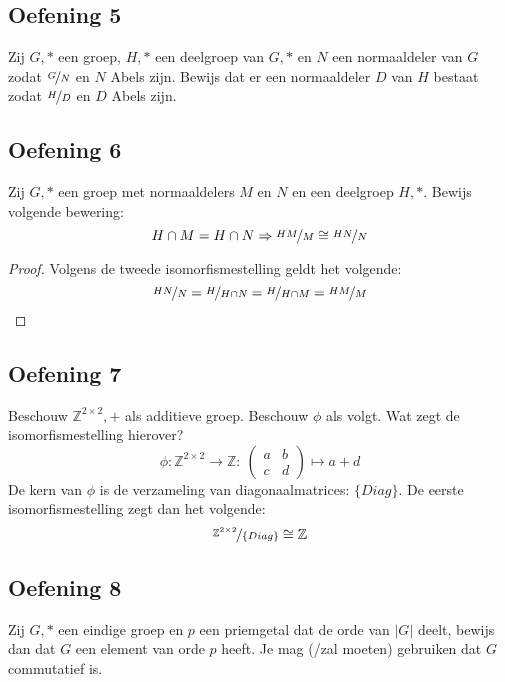 \documentclass[main.tex]{subfiles}
\begin{document}
\subsection*{Oefening 5}
\label{sec:oz5-oef5} 
Zij $G,*$ een groep, $H,*$ een deelgroep van $G,*$ en $N$ een normaaldeler van $G$ zodat $\nicefrac{G}{N}$ en $N$ Abels zijn.
Bewijs dat er een normaaldeler $D$ van $H$ bestaat zodat $\nicefrac{H}{D}$ en $D$ Abels zijn.

\subsection*{Oefening 6}
\label{sec:oz5-oef6}
Zij $G,*$ een groep met normaaldelers $M$ en $N$ en een deelgroep $H,*$. 
Bewijs volgende bewering:
\[ H \cap M = H \cap N \Rightarrow \nicefrac{HM}{M} \cong \nicefrac{HN}{N} \]
\begin{proof}
  Volgens de tweede isomorfismestelling geldt het volgende:
  \[ \nicefrac{HN}{N} = \nicefrac{H}{H\cap N} = \nicefrac{H}{H\cap M} = \nicefrac{HM}{M} \]
\end{proof}

\subsection*{Oefening 7}
\label{sec:oz5-oef7}
Beschouw $\mathbb{Z}^{2\times 2},+$ als additieve groep.
Beschouw $\phi$ als volgt. Wat zegt de isomorfismestelling hierover?
\[
\phi: \mathbb{Z}^{2\times 2} \rightarrow \mathbb{Z}:\
\begin{pmatrix}
  a & b\\
  c & d
\end{pmatrix}
\mapsto a + d
\]
De kern van $\phi$ is de verzameling van diagonaalmatrices: $\{Diag\}$.
De eerste isomorfismestelling zegt dan het volgende:
\[ \nicefrac{\mathbb{Z}^{2\times 2}}{\{Diag\}} \cong \mathbb{Z} \]
\begin{figure}[H]
  \centering
\end{figure}

\subsection*{Oefening 8}
Zij $G,*$ een eindige groep en $p$ een priemgetal dat de orde van $|G|$ deelt, bewijs dan dat $G$ een element van orde $p$ heeft. Je mag (/zal moeten) gebruiken dat $G$ commutatief is.
\question{Hoe??}
\end{document}
